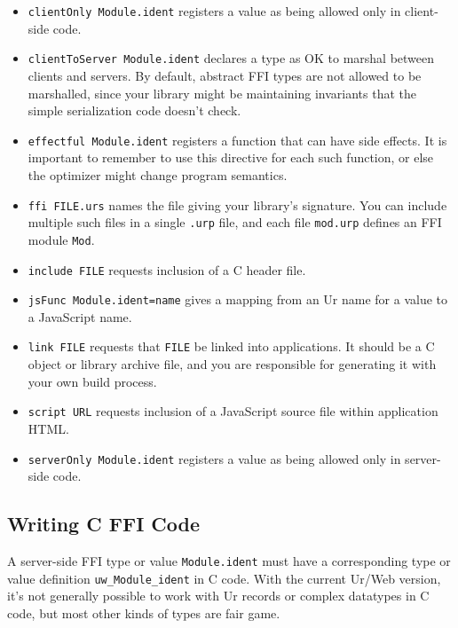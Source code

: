 \documentclass{article}
\begin{document}
\begin{itemize}
\item \texttt{clientOnly Module.ident} registers a value as being allowed only in client-side code.
\item \texttt{clientToServer Module.ident} declares a type as OK to marshal between clients and servers.  By default, abstract FFI types are not allowed to be marshalled, since your library might be maintaining invariants that the simple serialization code doesn't check.
\item \texttt{effectful Module.ident} registers a function that can have side effects.  It is important to remember to use this directive for each such function, or else the optimizer might change program semantics.
\item \texttt{ffi FILE.urs} names the file giving your library's signature.  You can include multiple such files in a single \texttt{.urp} file, and each file \texttt{mod.urp} defines an FFI module \texttt{Mod}.
\item \texttt{include FILE} requests inclusion of a C header file.
\item \texttt{jsFunc Module.ident=name} gives a mapping from an Ur name for a value to a JavaScript name.
\item \texttt{link FILE} requests that \texttt{FILE} be linked into applications.  It should be a C object or library archive file, and you are responsible for generating it with your own build process.
\item \texttt{script URL} requests inclusion of a JavaScript source file within application HTML.
\item \texttt{serverOnly Module.ident} registers a value as being allowed only in server-side code.
\end{itemize}

\subsection{Writing C FFI Code}

A server-side FFI type or value \texttt{Module.ident} must have a corresponding type or value definition \texttt{uw\_Module\_ident} in C code.  With the current Ur/Web version, it's not generally possible to work with Ur records or complex datatypes in C code, but most other kinds of types are fair game.
\end{document}
